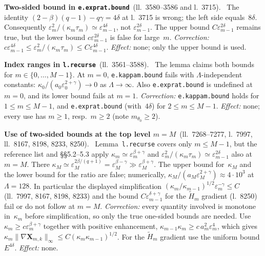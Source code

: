 \documentclass[11pt]{amsart}
\newcommand{\ep}{\varepsilon}
\newcommand{\Chi}{\mathbf{X}}
\newcommand{\Ln}[1]{l.~#1}
\newcommand{\Lns}[1]{ll.~#1}
\newcommand{\lab}[1]{\texttt{#1}}
\theoremstyle{remark}
\newenvironment{erratum}[2]{\par\smallskip\noindent\textbf{#1}\ {\small(#2)}.\ }{\par}
\begin{document}
\begin{erratum}{Two-sided bound in \lab{e.exprat.bound}}{\Lns{3580--3586} and \Ln{3715}}
The identity $(2-\beta)(q-1)-q\gamma=4\delta$ at \Ln{3715} is wrong; the left side equals~$8\delta$. Consequently $\ep_m^2/(\kappa_m\tau_m)\simeq\ep_{m-1}^{4\delta}$, not $\ep_{m-1}^{2\delta}$. The upper bound $C\ep_{m-1}^{2\delta}$ remains true, but the lower bound $c\ep_{m-1}^{2\delta}$ is false for large~$m$. \emph{Correction:} $c\ep_{m-1}^{4\delta}\leq\ep_m^2/(\kappa_m\tau_m)\leq C\ep_{m-1}^{4\delta}$. \emph{Effect:} none; only the upper bound is used.
\end{erratum}

\begin{erratum}{Index ranges in \lab{l.recurse}}{\Lns{3561--3588}}
The lemma claims both bounds for $m\in\{0,\ldots,M-1\}$. At $m=0$, \lab{e.kappam.bound} fails with $\Lambda$-independent constants: $\kappa_0/(a_0\ep_0^{2+\gamma})\to0$ as $\Lambda\to\infty$. Also \lab{e.exprat.bound} is undefined at $m=0$, and its lower bound fails at $m=1$. \emph{Correction:} \lab{e.kappam.bound} holds for $1\leq m\leq M-1$, and \lab{e.exprat.bound} (with~$4\delta$) for $2\leq m\leq M-1$. \emph{Effect:} none; every use has $m\geq1$, resp.\ $m\geq2$ (note $m_{\theta_0}\geq2$).
\end{erratum}

\begin{erratum}{Use of two-sided bounds at the top level $m=M$}{\Lns{7268--7277}, \Ln{7997}, \Lns{8167, 8198, 8233, 8250}}
Lemma~\lab{l.recurse} covers only $m\leq M-1$, but the reference list and \S\S5.2--5.3 apply $\kappa_m\simeq\ep_m^{\beta+\gamma}$ and $\ep_m^2/(\kappa_m\tau_m)\simeq\ep_{m-1}^{2\delta}$ also at $m=M$. There $\kappa_M\simeq\ep_M^{2\beta/(q+1)}=\ep_M^{\beta-\gamma}\gg\ep_M^{\beta+\gamma}$. The upper bound for~$\kappa_M$ and the lower bound for the ratio are false; numerically, $\kappa_M/(a_M\ep_M^{2+\gamma})\approx4\cdot10^3$ at $\Lambda=128$. In particular the displayed simplification $(\kappa_m/\kappa_{m-1})^{1/2}\ep_m^{-\gamma}\leq C$ (\Lns{7997, 8167, 8198, 8233}) and the bound $C\ep_{m-1}^{\delta+\gamma}$ for the $\widetilde H_m$ gradient (\Ln{8250}) fail or do not follow at $m=M$. \emph{Correction:} every quantity involved is monotone in~$\kappa_m$ before simplification, so only the true one-sided bounds are needed. Use $\kappa_m\geq c\ep_m^{\beta+\gamma}$ together with positive enhancement, $\kappa_{m-1}\kappa_m\geq c\,a_m^2\ep_m^4$, which gives $\kappa_m\|\nabla\Chi_{m,k}\|_\infty\leq C(\kappa_m\kappa_{m-1})^{1/2}$. For the $\widetilde H_m$ gradient use the uniform bound $E^{4\delta}$. \emph{Effect:} none.
\end{erratum}
\end{document}
